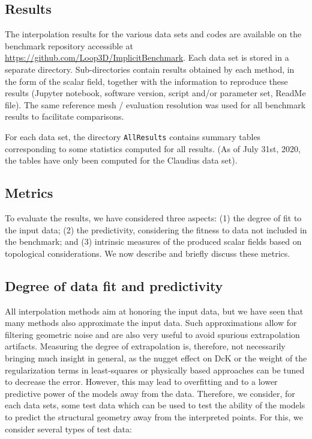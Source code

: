 \documentclass[preprint]{ring20}
\begin{document}
{\subsection{Results}
The interpolation results for the various data sets and codes are available on the benchmark repository accessible at \url{https://github.com/Loop3D/ImplicitBenchmark}. Each data set is stored in a separate directory. Sub-directories contain results obtained by each method, in the form of the scalar field, together with the information to reproduce these results (Jupyter notebook, software version, script and/or parameter set, ReadMe file). The same reference mesh / evaluation resolution was used for all benchmark results to facilitate comparisons. 

For each data set, the directory \texttt{AllResults} contains summary tables corresponding to some statistics computed for all results. (As of July 31st, 2020, the tables have only been computed for the Claudius data set). 

\subsection{Metrics}
To evaluate the results, we have considered three aspects: (1) the degree of fit to the input data; (2) the predictivity, considering the fitness to data not included in the benchmark; and (3) intrinsic measures of the produced scalar fields based on topological considerations. We now describe and briefly discuss these metrics. 

\subsection{Degree of data fit and predictivity}

All interpolation methods aim at honoring the input data, but we have seen that many methods also approximate the input data. Such approximations allow for filtering geometric noise and are also very useful to avoid spurious extrapolation artifacts. 
Measuring the degree of extrapolation is, therefore, not necessarily bringing much insight in general, as the nugget effect on DcK or the weight of the regularization terms in least-squares or physically based approaches can be tuned to decrease the error. However, this may lead to overfitting and to a lower predictive power of the models away from the data. Therefore, we consider, for each data sets, some test data which can be used to test the ability of the models to predict the structural geometry away from the interpreted points. For this, we consider several types of test data:

}
\end{document}

